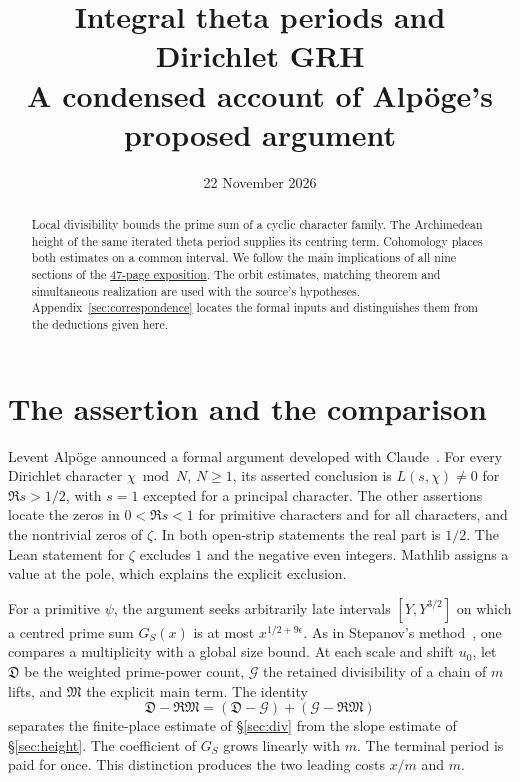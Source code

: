 \documentclass[letterpaper,11pt]{article}
\title{Integral theta periods and Dirichlet GRH\\[3pt]\large A condensed account of Alp\"oge's proposed argument}
\author{}
\date{22 November 2026}
\newcommand{\Dsum}{\mathfrak D}
\newcommand{\Msum}{\mathfrak M}
\newcommand{\Gain}{\mathcal G}
\begin{document}
\maketitle
\begin{abstract}
Local divisibility bounds the prime sum of a cyclic character family. The Archimedean height of the same iterated theta period supplies its centring term. Cohomology places both estimates on a common interval. We follow the main implications of all nine sections of the \href{https://doi.org/10.5281/zenodo.24413008}{47-page exposition}. The orbit estimates, matching theorem and simultaneous realization are used with the source's hypotheses. Appendix~\ref{sec:correspondence} locates the formal inputs and distinguishes them from the deductions given here.
\end{abstract}

\section{The assertion and the comparison}
Levent Alp\"oge announced a formal argument developed with Claude~\cite{alpoge}. For every Dirichlet character \(\chi\bmod N\), \(N\ge1\), its asserted conclusion is \(L(s,\chi)\ne0\) for \(\Re s>1/2\), with \(s=1\) excepted for a principal character. The other assertions locate the zeros in \(0<\Re s<1\) for primitive characters and for all characters, and the nontrivial zeros of \(\zeta\). In both open-strip statements the real part is \(1/2\). The Lean statement for \(\zeta\) excludes \(1\) and the negative even integers. Mathlib assigns a value at the pole, which explains the explicit exclusion.

For a primitive \(\psi\), the argument seeks arbitrarily late intervals \([Y,Y^{3/2}]\) on which a centred prime sum \(G_S(x)\) is at most \(x^{1/2+9\epsilon}\). As in Stepanov's method~\cite{stepanov,bombieri}, one compares a multiplicity with a global size bound. At each scale and shift \(u_0\), let \(\Dsum\) be the weighted prime-power count, \(\Gain\) the retained divisibility of a chain of \(m\) lifts, and \(\Msum\) the explicit main term. The identity
\[
 \Dsum-\Re\Msum=(\Dsum-\Gain)+(\Gain-\Re\Msum)
\]
separates the finite-place estimate of \S\ref{sec:div} from the slope estimate of \S\ref{sec:height}. The coefficient of \(G_S\) grows linearly with \(m\). The terminal period is paid for once. This distinction produces the two leading costs \(x/m\) and \(m\).
\end{document}
